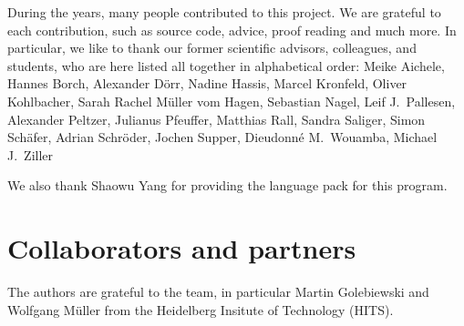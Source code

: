 During the years, many people contributed to this project.
We are grateful to each contribution, such as source code, advice, proof reading
and much more. In particular, we like to thank our former scientific advisors,
colleagues, and students, who are here listed all together in alphabetical
order:
Meike Aichele,
Hannes Borch,
Alexander D\"orr,
Nadine Hassis,
Marcel Kronfeld,
Oliver Kohlbacher,
Sarah Rachel M\"uller vom Hagen,
Sebastian Nagel,
Leif J.~Pallesen,
Alexander Peltzer,
Julianus Pfeuffer,
Matthias Rall,
Sandra Saliger,
Simon Sch\"afer,
Adrian Schr\"oder,
Jochen Supper,
Dieudonn\'e M.~Wouamba,
Michael J.~Ziller

We also thank Shaowu Yang for providing the \Chinese language pack for this program.


\section{Collaborators and partners}

The authors are grateful to the \SABIO team, in particular Martin Golebiewski and Wolfgang M\"uller from the Heidelberg Insitute of Technology (HITS).

%
